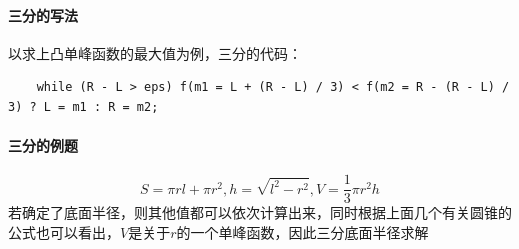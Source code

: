 \documentclass[]{cpp}
\begin{document}
\paragraph{三分的写法} 以求上凸单峰函数的最大值为例，三分的代码：
	\begin{verbatim}
	while (R - L > eps) f(m1 = L + (R - L) / 3) < f(m2 = R - (R - L) / 3) ? L = m1 : R = m2;
	\end{verbatim}
\paragraph{三分的例题} $$S=\pi rl+\pi r^2,h=\sqrt{l^2-r^2},V=\frac{1}{3}\pi r^2 h$$
	若确定了底面半径，则其他值都可以依次计算出来，同时根据上面几个有关圆锥的公式也可以看出，$V$是关于$r$的一个单峰函数，因此三分底面半径求解
\end{document}
